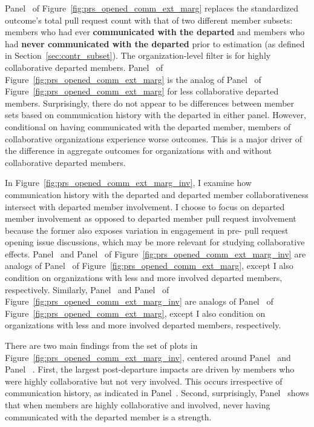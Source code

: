 \documentclass[12pt,notitlepage]{article}
\begin{document}
Panel~ of Figure~\ref{fig:prs_opened_comm_ext_marg} replaces the standardized outcome’s total pull request count with that of two different member subsets: members who had ever \textbf{communicated with the departed} and members who had \textbf{never communicated with the departed} prior to estimation (as defined in Section~\ref{sec:contr_subset}). The organization-level filter is for highly collaborative departed members. Panel~ of Figure~\ref{fig:prs_opened_comm_ext_marg} is the analog of Panel~ of Figure~\ref{fig:prs_opened_comm_ext_marg} for less collaborative departed members. Surprisingly, there do not appear to be differences between member sets based on communication history with the departed in either panel. However, conditional on having communicated with the departed member, members of collaborative organizations experience worse outcomes. This is a major driver of the difference in aggregate outcomes for organizations with and without collaborative departed members. 

In Figure~\ref{fig:prs_opened_comm_ext_marg_inv}, I examine how communication history with the departed and departed member collaborativeness intersect with departed member involvement. I choose to focus on departed member involvement as opposed to departed member pull request involvement because the former also exposes variation in engagement in pre- pull request opening issue discussions, which may be more relevant for studying collaborative effects. Panel~ and Panel~ of Figure~\ref{fig:prs_opened_comm_ext_marg_inv} are analogs of Panel~ of Figure~\ref{fig:prs_opened_comm_ext_marg}, except I also condition on organizations with less and more involved departed members, respectively. Similarly, Panel~ and Panel~ of Figure~\ref{fig:prs_opened_comm_ext_marg_inv} are analogs of Panel~ of Figure~\ref{fig:prs_opened_comm_ext_marg}, except I also condition on organizations with less and more involved departed members, respectively. 

There are two main findings from the set of plots in Figure~\ref{fig:prs_opened_comm_ext_marg_inv}, centered around Panel~ and Panel~ . First, the largest post-departure impacts are driven by members who were highly collaborative but not very involved. This occurs irrespective of communication history, as indicated in Panel~. Second, surprisingly, Panel~ shows that when members are highly collaborative and involved, never having communicated with the departed member is a strength. 
\end{document}
